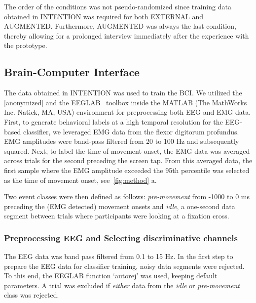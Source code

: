 The order of the conditions was not pseudo-randomized since training data obtained in INTENTION was required for both EXTERNAL and AUGMENTED. Furthermore, AUGMENTED was always the last condition, thereby allowing for a prolonged interview immediately after the experience with the prototype.

\subsection{Brain-Computer Interface}\label{BCI}
The data obtained in INTENTION was used to train the BCI. We utilized the [anonymized] and the EEGLAB~\cite{Delorme2004-sn} toolbox inside the MATLAB (The MathWorks Inc. Natick, MA, USA) environment for preprocessing both EEG and EMG data. First, to generate behavioral labels at a high temporal resolution for the EEG-based classifier, we leveraged EMG data from the flexor digitorum profundus. EMG amplitudes were band-pass filtered from 20 to 100 Hz and subsequently squared. Next, to label the time of movement onset, the EMG data was averaged across trials for the second preceding the screen tap. From this averaged data, the first sample where the EMG amplitude exceeded the 95th percentile was selected as the time of movement onset, see~\ref{fig:method} a.


Two event classes were then defined as follows: \textit{pre-movement} from -1000 to 0 ms preceding the (EMG detected) movement onsets and \textit{idle}, a one-second data segment between trials where participants were looking at a fixation cross.

\subsubsection{Preprocessing EEG and Selecting discriminative channels}\label{eeg_methods}
The EEG data was band pass filtered from 0.1 to 15 Hz. In the first step to prepare the EEG data for classifier training, noisy data segments were rejected. To this end, the EEGLAB function `autorej' was used, keeping default parameters. A trial was excluded if \textit{either} data from the \textit{idle} or \textit{pre-movement} class was rejected.

